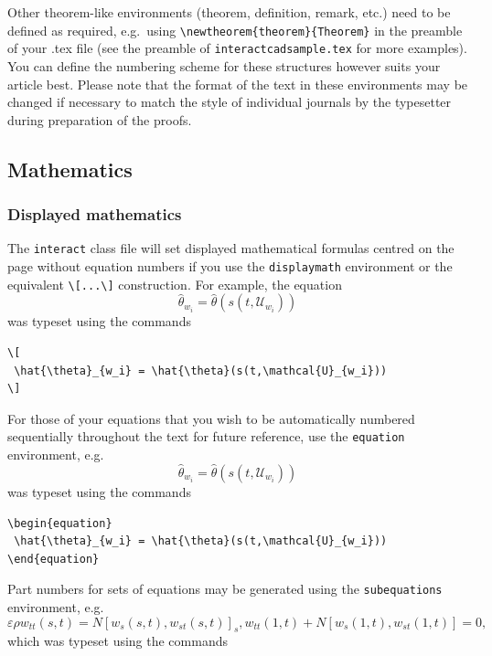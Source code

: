 \documentclass[]{interact}
\theoremstyle{plain}%
\theoremstyle{definition}
\theoremstyle{remark}
\begin{document}
Other theorem-like environments (theorem, definition, remark, etc.) need
to be defined as required, e.g.~using
\texttt{\textbackslash{}newtheorem\{theorem\}\{Theorem\}} in the
preamble of your .tex file (see the preamble of
\texttt{interactcadsample.tex} for more examples). You can define the
numbering scheme for these structures however suits your article best.
Please note that the format of the text in these environments may be
changed if necessary to match the style of individual journals by the
typesetter during preparation of the proofs.

\hypertarget{mathematics}{%
\subsection{Mathematics}\label{mathematics}}

\hypertarget{displayed-mathematics}{%
\subsubsection{Displayed mathematics}\label{displayed-mathematics}}

The \texttt{interact} class file will set displayed mathematical
formulas centred on the page without equation numbers if you use the
\texttt{displaymath} environment or the equivalent
\texttt{\textbackslash{}{[}...\textbackslash{}{]}} construction. For
example, the equation \[
 \hat{\theta}_{w_i} = \hat{\theta}(s(t,\mathcal{U}_{w_i}))
\] was typeset using the commands

\begin{verbatim}
\[
 \hat{\theta}_{w_i} = \hat{\theta}(s(t,\mathcal{U}_{w_i}))
\]
\end{verbatim}

For those of your equations that you wish to be automatically numbered
sequentially throughout the text for future reference, use the
\texttt{equation} environment, e.g. \begin{equation}
 \hat{\theta}_{w_i} = \hat{\theta}(s(t,\mathcal{U}_{w_i}))
\end{equation} was typeset using the commands

\begin{verbatim}
\begin{equation}
 \hat{\theta}_{w_i} = \hat{\theta}(s(t,\mathcal{U}_{w_i}))
\end{equation}
\end{verbatim}

Part numbers for sets of equations may be generated using the
\texttt{subequations} environment, e.g.
\begin{subequations} \label{subeqnexample}
\begin{equation}
     \varepsilon \rho w_{tt}(s,t) = N[w_{s}(s,t),w_{st}(s,t)]_{s},
     \label{subeqnparta}
\end{equation}
\begin{equation}
     w_{tt}(1,t)+N[w_{s}(1,t),w_{st}(1,t)] = 0,
     \label{subeqnpartb}
\end{equation}
\end{subequations} which was typeset using the commands
\end{document}
